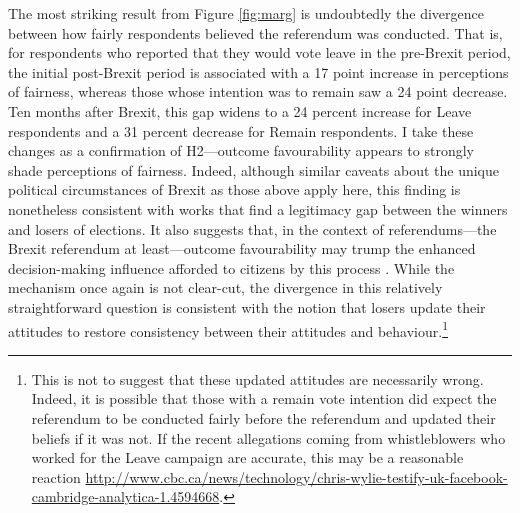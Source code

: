 \documentclass[12pt, letter]{article}
\begin{document}
The most striking result from Figure \ref{fig:marg} is undoubtedly the divergence between how fairly respondents believed the referendum was conducted. That is, for respondents who reported that they would vote leave in the pre-Brexit period, the initial post-Brexit period is associated with a 17 point increase in perceptions of fairness, whereas those whose intention was to remain saw a 24 point decrease. Ten months after Brexit, this gap widens to a 24 percent increase for Leave respondents and a 31 percent decrease for Remain respondents. I take these changes as a confirmation of H2---outcome favourability appears to strongly shade perceptions of fairness. Indeed, although similar caveats about the unique political circumstances of Brexit as those above apply here, this finding is nonetheless consistent with works that find a legitimacy gap between the winners and losers of elections. It also suggests that, in the context of referendums---the Brexit referendum at least---outcome favourability may trump the enhanced decision-making influence afforded to citizens by this process \parencite{arnesen2017legitimacy}. While the mechanism once again is not clear-cut, the divergence in this relatively straightforward question is consistent with the notion that losers update their attitudes to restore consistency between their attitudes and behaviour.\footnote{This is not to suggest that these updated attitudes are necessarily wrong. Indeed, it is possible that those with a remain vote intention did expect the referendum to be conducted fairly before the referendum and updated their beliefs if it was not. If the recent allegations coming from whistleblowers who worked for the Leave campaign are accurate, this may be a reasonable reaction \url{http://www.cbc.ca/news/technology/chris-wylie-testify-uk-facebook-cambridge-analytica-1.4594668}.}
\end{document}
